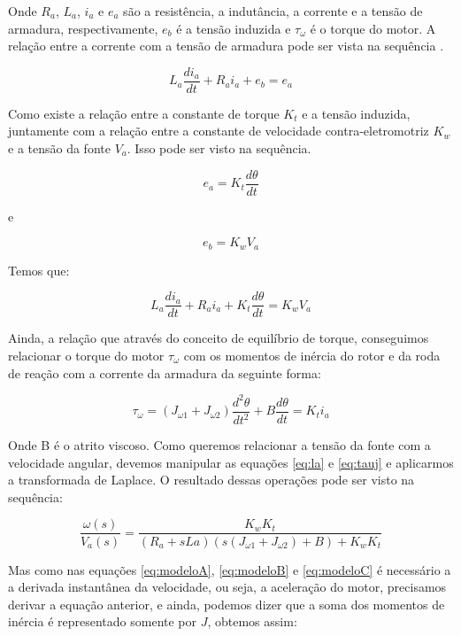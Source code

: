 Onde $R_a$, $L_a$, $i_a$ e $e_a$ são a resistência, a indutância, a corrente e a tensão de armadura, respectivamente, $e_b$ é a tensão induzida e $\tau_{\omega}$ é o torque do motor. A relação entre a corrente com a tensão de armadura pode ser vista na sequência \cite{Ogata}.

\begin{equation}
L_a \frac{di_a}{dt}+R_a i_a + e_b = e_a
\end{equation}

Como existe a relação entre a constante de torque $K_t$ e a tensão induzida, juntamente com a relação entre a constante de velocidade contra-eletromotriz $K_w$ e a tensão da fonte $V_a$. Isso pode ser visto na sequência.

\begin{equation}
  e_a = K_t\frac{d\theta}{dt}
\end{equation}

e

\begin{equation}
  e_b = K_wV_a
\end{equation}

Temos que:

\begin{equation}\label{eq:la}
L_a \frac{di_a}{dt}+R_a i_a + K_t\frac{d\theta}{dt} = K_wV_a
\end{equation}

Ainda, a relação que através do conceito de equilíbrio de torque, conseguimos relacionar o torque do motor $\tau_{\omega}$ com os momentos de inércia do rotor e da roda de reação com a corrente da armadura da seguinte forma:

\begin{equation}\label{eq:tauj}
\tau_{\omega} = (J_{\omega 1} + J_{\omega 2})\frac{d^{2}\theta}{dt^{2}}+B\frac{d\theta}{dt} = K_t i_a
\end{equation}

Onde B é o atrito viscoso. Como queremos relacionar a tensão da fonte com a velocidade angular, devemos manipular as equações \ref{eq:la} e \ref{eq:tauj} e aplicarmos a transformada de Laplace. O resultado dessas operações pode ser visto na sequência: 

\begin{equation}
  \frac{\omega(s)}{V_a(s)} = \frac{K_wK_t}{(R_a+ sLa)(s(J_{\omega 1} + J_{\omega 2})+B)+K_wK_t}  
\end{equation}

Mas como nas equações \ref{eq:modeloA}, \ref{eq:modeloB} e \ref{eq:modeloC} é necessário a a derivada instantânea da velocidade, ou seja, a aceleração do motor, precisamos derivar a equação anterior, e ainda, podemos dizer que a soma dos momentos de inércia é representado somente por $J$, obtemos assim:

